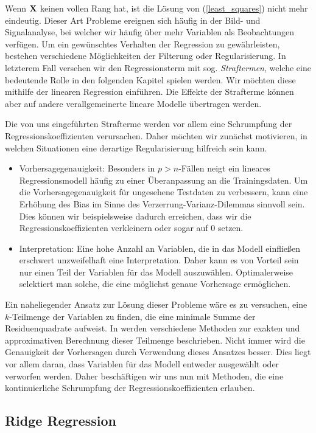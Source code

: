Wenn $\mathbf{X}$ keinen vollen Rang hat, ist die Lösung von (\ref{least_squares}) nicht mehr eindeutig. Dieser Art Probleme ereignen sich häufig in der Bild- und Signalanalyse, bei welcher wir häufig über mehr Variablen als Beobachtungen verfügen. Um ein gewünschtes Verhalten der Regression zu gewährleisten, bestehen verschiedene Möglichkeiten der Filterung oder Regularisierung. In letzterem Fall versehen wir den Regressionsterm mit sog. \textit{Straftermen}, welche eine bedeutende Rolle in den folgenden Kapitel spielen werden. Wir möchten diese mithilfe der linearen Regression einführen. Die Effekte der Strafterme können aber auf andere verallgemeinerte lineare Modelle übertragen werden. 

Die von uns eingeführten Strafterme werden vor allem eine Schrumpfung der Regressionskoeffizienten verursachen. Daher möchten wir zunächst motivieren, in welchen Situationen eine derartige Regularisierung hilfreich sein kann.
\begin{itemize}
\item Vorhersagegenauigkeit: Besonders in $p > n$-Fällen neigt ein lineares Regressionsmodell häufig zu einer Überanpassung an die Trainingsdaten. Um die Vorhersagegenauigkeit für ungesehene Testdaten zu verbessern, kann eine Erhöhung des Bias im Sinne des Verzerrung-Varianz-Dilemmas sinnvoll sein. Dies können wir beispielsweise dadurch erreichen, dass wir die Regressionskoeffizienten verkleinern oder sogar auf 0 setzen.
\item Interpretation: Eine hohe Anzahl an Variablen, die in das Modell einfließen erschwert unzweifelhaft eine Interpretation. Daher kann es von Vorteil sein nur einen Teil der Variablen für das Modell auszuwählen. Optimalerweise selektiert man solche, die eine möglichst genaue Vorhersage ermöglichen.
\end{itemize}

Ein naheliegender Ansatz zur Lösung dieser Probleme wäre es zu versuchen, eine $k$-Teilmenge der Variablen zu finden, die eine minimale Summe der Residuenquadrate aufweist. In \cite{hastie_elements} werden verschiedene Methoden zur exakten und approximativen Berechnung dieser Teilmenge beschrieben. Nicht immer wird die Genauigkeit der Vorhersagen durch Verwendung dieses Ansatzes besser. Dies liegt vor allem daran, dass Variablen für das Modell entweder ausgewählt oder verworfen werden. Daher beschäftigen wir uns nun mit Methoden, die eine kontinuierliche Schrumpfung der Regressionskoeffizienten erlauben.

\subsection{Ridge Regression}

